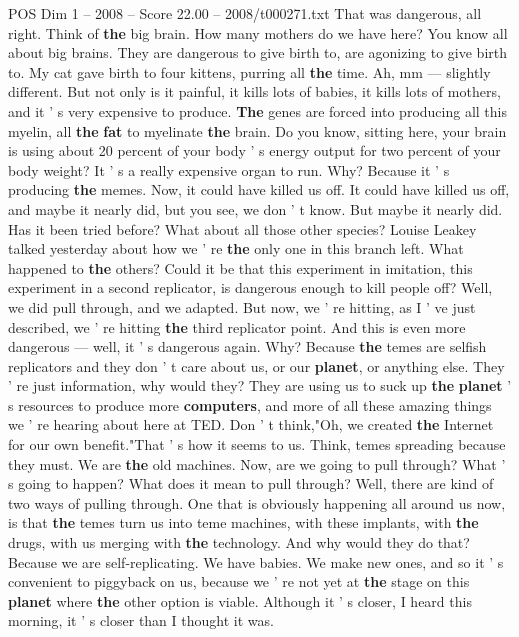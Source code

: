\begin{textsample}{POS Dim 1 – 2008 – Score 22.00 – 2008/t000271.txt}
That was dangerous, all right.
Think of \textbf{the} big brain.
How many mothers do we have here?
You know all about big brains.
They are dangerous to give birth to, are agonizing to give birth to.
My cat gave birth to four kittens, purring all \textbf{the} time.
Ah, mm — slightly different.
But not only is it painful, it kills lots of babies, it kills lots of mothers, and it ' s very expensive to produce. \textbf{The} genes are forced into producing all this myelin, all \textbf{the} \textbf{fat} to myelinate \textbf{the} brain.
Do you know, sitting here, your brain is using about 20 percent of your body ' s energy output for two percent of your body weight?
It ' s a really expensive organ to run.
Why?
Because it ' s producing \textbf{the} memes.
Now, it could have killed us off.
It could have killed us off, and maybe it nearly did, but you see, we don ' t know.
But maybe it nearly did.
Has it been tried before?
What about all those other species?
Louise Leakey talked yesterday about how we ' re \textbf{the} only one in this branch left.
What happened to \textbf{the} others?
Could it be that this experiment in imitation, this experiment in a second replicator, is dangerous enough to kill people off?
Well, we did pull through, and we adapted.
But now, we ' re hitting, as I ' ve just described, we ' re hitting \textbf{the} third replicator point.
And this is even more dangerous — well, it ' s dangerous again.
Why?
Because \textbf{the} temes are selfish replicators and they don ' t care about us, or our \textbf{planet}, or anything else.
They ' re just information, why would they?
They are using us to suck up \textbf{the} \textbf{planet} ' s resources to produce more \textbf{computers}, and more of all these amazing things we ' re hearing about here at TED.
Don ' t think,"Oh, we created \textbf{the} Internet for our own benefit."That ' s how it seems to us.
Think, temes spreading because they must.
We are \textbf{the} old machines.
Now, are we going to pull through?
What ' s going to happen?
What does it mean to pull through?
Well, there are kind of two ways of pulling through.
One that is obviously happening all around us now, is that \textbf{the} temes turn us into teme machines, with these implants, with \textbf{the} drugs, with us merging with \textbf{the} technology.
And why would they do that?
Because we are self-replicating.
We have babies.
We make new ones, and so it ' s convenient to piggyback on us, because we ' re not yet at \textbf{the} stage on this \textbf{planet} where \textbf{the} other option is viable.
Although it ' s closer, I heard this morning, it ' s closer than I thought it was.

\end{textsample}
